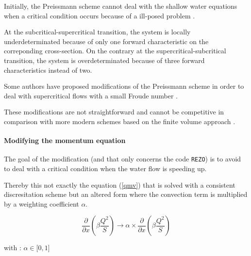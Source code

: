 \hspace*{1cm}

Initially, the Preissmann scheme cannot deal with the shallow water equations when a critical condition occurs because of a ill-posed problem \cite{MESELHE97}.

\vspace{0.5cm}

At the subcritical-supercritical transition, the system is locally underdeterminated because of only one forward characteristic on the correponding cross-section. On the contrary at the supercritical-subcritical transition, 
the system is overdeterminated because of three forward characteristics instead of two.

\vspace{0.5cm}

Some authors have proposed modifications of the Preissmann scheme in order to deal with supercritical flows with a small Froude number \cite{KUTIJA02}\cite{JOHNSON02}.

These modifications are not straightforward and cannot be competitive in comparison with more modern schemes based on the finite volume approach \cite{TORO01}.

\paragraph{Modifying the momentum equation\\}

\hspace*{1cm}

The goal of the modification (and that only concerns the code \texttt{REZO}) is to avoid to deal with a critical condition when the water flow is speeding up.

\vspace{0.5cm}

Thereby this not exactly the equation (\ref{qmv}) that is solved with a consistent discresitation scheme but an altered form where the convection term is multiplied by a weighting coefficient $\alpha$. 

\begin{equation}
 \frac{\partial}{\partial x}\left( {\beta \frac{Q^2}{S}} \right) \rightarrow \alpha \times \frac{\partial}{\partial x}\left( {\beta \frac{Q^2}{S}} \right)
\end{equation}

with : $\alpha \in \lbrack 0,1 \rbrack$

\vspace{0.5cm}

